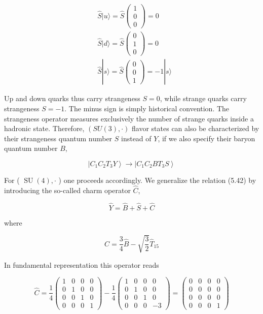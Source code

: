 \documentclass[10pt, letterpaper]{article}
\begin{document}
$$
\begin{aligned}
& \hat{S}|u\rangle=\hat{S}\left(\begin{array}{l}
1 \\
0 \\
0
\end{array}\right)=0 \\
& \hat{S}|d\rangle=\hat{S}\left(\begin{array}{l}
0 \\
1 \\
0
\end{array}\right)=0 \\
& \hat{S}|s\rangle=\hat{S}\left(\begin{array}{l}
0 \\
0 \\
1
\end{array}\right)=-1|s\rangle
\end{aligned}
$$

Up and down quarks thus carry strangeness $S=0$, while strange quarks carry strangeness $S=-1$. The minus sign is simply historical convention. The strangeness operator measures exclusively the number of strange quarks inside a hadronic state. Therefore, $(S U(3), \cdot)$ flavor states can also be characterized by their strangeness quantum number $S$ instead of $Y$, if we also specify their baryon quantum number $B$,

$$
\left|C_{1} C_{2} T_{3} Y\right\rangle \longrightarrow\left|C_{1} C_{2} B T_{3} S\right\rangle
$$

For ( $\operatorname{SU}(4), \cdot$ ) one proceeds accordingly. We generalize the relation (5.42) by introducing the so-called charm operator $\hat{C}$,

$$
\hat{Y}=\hat{B}+\hat{S}+\hat{C}
$$

where

$$
\hat{C}=\frac{3}{4} \hat{B}-\sqrt{\frac{3}{2}} \hat{T}_{15}
$$

In fundamental representation this operator reads

$$
\hat{C}=\frac{1}{4}\left(\begin{array}{cccc}
1 & 0 & 0 & 0 \\
0 & 1 & 0 & 0 \\
0 & 0 & 1 & 0 \\
0 & 0 & 0 & 1
\end{array}\right)-\frac{1}{4}\left(\begin{array}{cccc}
1 & 0 & 0 & 0 \\
0 & 1 & 0 & 0 \\
0 & 0 & 1 & 0 \\
0 & 0 & 0 & -3
\end{array}\right)=\left(\begin{array}{cccc}
0 & 0 & 0 & 0 \\
0 & 0 & 0 & 0 \\
0 & 0 & 0 & 0 \\
0 & 0 & 0 & 1
\end{array}\right)
$$
\end{document}
